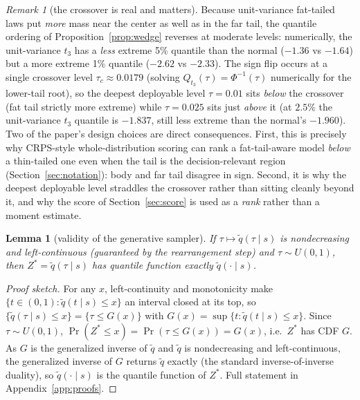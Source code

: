 \documentclass[11pt]{article}
\newtheorem{lemma}{Lemma}
\theoremstyle{remark}
\newtheorem{remark}{Remark}
\begin{document}
\begin{remark}[the crossover is real and matters]\label{rem:crossover}
Because unit-variance fat-tailed laws put \emph{more} mass near the
center as well as in the far tail, the quantile ordering of
Proposition~\ref{prop:wedge} reverses at moderate levels: numerically,
the unit-variance $t_3$ has a \emph{less} extreme 5\% quantile than the
normal ($-1.36$ vs $-1.64$) but a more extreme 1\% quantile ($-2.62$ vs
$-2.33$). The sign flip occurs at a single crossover level
$\tau_c \approx 0.0179$ (solving $Q_{t_3}(\tau)=\Phi^{-1}(\tau)$
numerically for the lower-tail root), so the deepest deployable level
$\tau = 0.01$ sits \emph{below} the crossover (fat tail strictly more
extreme) while $\tau = 0.025$ sits just \emph{above} it (at $2.5\%$ the
unit-variance $t_3$ quantile is $-1.837$, still less extreme than the
normal's $-1.960$). Two of the paper's design choices are direct
consequences. First, this is precisely why CRPS-style whole-distribution
scoring can rank a fat-tail-aware model \emph{below} a thin-tailed one
even when the tail is the decision-relevant region
(Section~\ref{sec:notation}): body and far tail disagree in sign.
Second, it is why the deepest deployable level straddles the crossover
rather than sitting cleanly beyond it, and why the score of
Section~\ref{sec:score} is used as a \emph{rank} rather than a moment
estimate.
\end{remark}

\begin{lemma}[validity of the generative sampler]\label{lem:sampler}
If $\tau \mapsto \widetilde{q}(\tau \mid s)$ is nondecreasing and
left-continuous (guaranteed by the rearrangement step) and
$\tau \sim U(0,1)$, then $Z^* = \widetilde{q}(\tau \mid s)$ has
quantile function exactly $\widetilde{q}(\cdot \mid s)$.
\end{lemma}
\begin{proof}[Proof sketch]
For any $x$, left-continuity and monotonicity make
$\{t\in(0,1):\widetilde{q}(t\mid s)\le x\}$ an interval closed at its
top, so $\{\widetilde q(\tau\mid s)\le x\}=\{\tau\le G(x)\}$ with
$G(x)=\sup\{t:\widetilde q(t\mid s)\le x\}$. Since $\tau\sim U(0,1)$,
$\Pr(Z^*\le x)=\Pr(\tau\le G(x))=G(x)$, i.e.\ $Z^*$ has CDF $G$. As $G$
is the generalized inverse of $\widetilde q$ and $\widetilde q$ is
nondecreasing and left-continuous, the generalized inverse of $G$
returns $\widetilde q$ exactly (the standard inverse-of-inverse
duality), so $\widetilde q(\cdot\mid s)$ is the quantile function of
$Z^*$. Full statement in Appendix~\ref{app:proofs}.
\end{proof}
\end{document}
